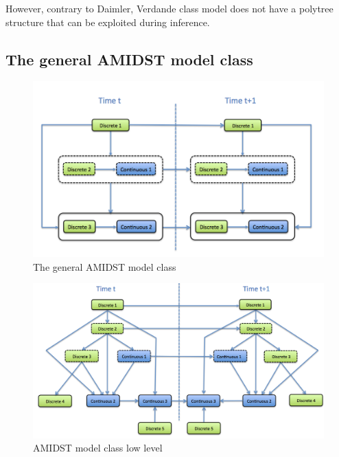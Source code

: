 However, contrary to Daimler, Verdande class model does not have a polytree structure that can be exploited during inference. 

\subsection{The general AMIDST model class}

\begin{figure}[ht!]
\begin{center}
\includegraphics[scale=0.4]{./figures/AMIDSTModelClassGeneral}
\caption{\label{Figure:AMIDSTModelClassHighLevel} The general AMIDST model class}
\end{center}
\end{figure}

\begin{figure}[ht!]
\begin{center}
\includegraphics[scale=0.4]{./figures/AMIDSTModelClass}
\caption{\label{Figure:AMIDSTModelClass} AMIDST model class low level}
\end{center}
\end{figure}

